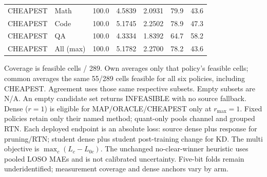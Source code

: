 \begin{table}[H]
\begin{tabular}{llrrrrr}
\midrule
CHEAPEST & Math & 100.0 & 4.5839 & 2.0931 & 79.9 & 43.6 \\
CHEAPEST & Code & 100.0 & 5.1745 & 2.2502 & 78.9 & 47.3 \\
CHEAPEST & QA & 100.0 & 4.3334 & 1.8392 & 64.7 & 58.2 \\
CHEAPEST & All (max) & 100.0 & 5.1782 & 2.2700 & 78.2 & 43.6 \\
\bottomrule
\end{tabular}
\par\smallskip
\begin{minipage}{\linewidth}\small
Coverage is feasible cells / 289. Own averages only that policy's feasible cells; common averages the same 55/289 cells feasible for all six policies, including CHEAPEST. Agreement uses those same respective subsets. Empty subsets are N/A. An empty candidate set returns INFEASIBLE with no source fallback. Dense ($r=1$) is eligible for MAP/ORACLE/CHEAPEST only at $r_{\max}=1$. Fixed policies retain only their named method; quant-only pools channel and grouped RTN. Each deployed endpoint is an absolute loss: source dense plus response for pruning/RTN; student dense plus student post-training change for KD. The multi objective is $\max_c(L_c-L_{0c})$. The unchanged no-clear-winner heuristic uses pooled LOSO MAEs and is not calibrated uncertainty. Five-bit folds remain underidentified; measurement coverage and dense anchors vary by arm.
\end{minipage}
\end{table}
